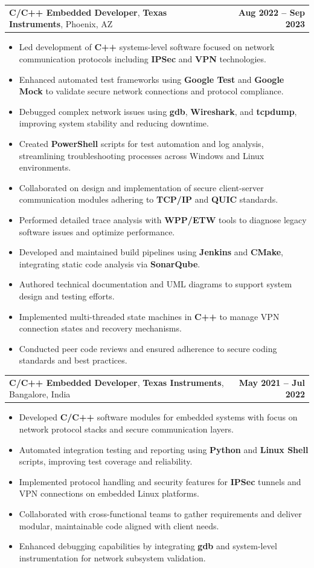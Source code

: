 \documentclass[letterpaper,11pt]{article}
\makeatletter
\newcommand{\resumeItem}[1]{
  \item\footnotesize{
    {#1 \vspace{-2pt}}
  }
}
\newcommand{\resumeSubheading}[4]{
  \vspace{-2pt}\item
    \begin{tabular*}{1.0\textwidth}[t]{l@{\extracolsep{\fill}}r}
      \textbf{\fontsize{10pt}{14pt}\selectfont #3}, \textbf{\fontsize{10pt}{14pt}\selectfont #1}, \fontsize{10pt}{14pt}\selectfont #4 & \textbf{\fontsize{10pt}{14pt}\selectfont #2} \\
    \end{tabular*}\vspace{-7pt}
}
\newcommand{\resumeItemListStart}{\begin{itemize}[leftmargin=*]}
\newcommand{\resumeItemListEnd}{\end{itemize}\vspace{-5pt}}
\makeatother
\begin{document}
    \resumeSubheading
        {Texas Instruments}{Aug 2022 -- Sep 2023}
        {C/C++ Embedded Developer}{Phoenix, AZ}
      \resumeItemListStart
        \resumeItem{Led development of \textbf{C++} systems-level software focused on network communication protocols including \textbf{IPSec} and \textbf{VPN} technologies.}
        \resumeItem{Enhanced automated test frameworks using \textbf{Google Test} and \textbf{Google Mock} to validate secure network connections and protocol compliance.}
        \resumeItem{Debugged complex network issues using \textbf{gdb}, \textbf{Wireshark}, and \textbf{tcpdump}, improving system stability and reducing downtime.}
        \resumeItem{Created \textbf{PowerShell} scripts for test automation and log analysis, streamlining troubleshooting processes across Windows and Linux environments.}
        \resumeItem{Collaborated on design and implementation of secure client-server communication modules adhering to \textbf{TCP/IP} and \textbf{QUIC} standards.}
        \resumeItem{Performed detailed trace analysis with \textbf{WPP/ETW} tools to diagnose legacy software issues and optimize performance.}
        \resumeItem{Developed and maintained build pipelines using \textbf{Jenkins} and \textbf{CMake}, integrating static code analysis via \textbf{SonarQube}.}
        \resumeItem{Authored technical documentation and UML diagrams to support system design and testing efforts.}
        \resumeItem{Implemented multi-threaded state machines in \textbf{C++} to manage VPN connection states and recovery mechanisms.}
        \resumeItem{Conducted peer code reviews and ensured adherence to secure coding standards and best practices.}
      \resumeItemListEnd

    \resumeSubheading
        {Texas Instruments}{May 2021 -- Jul 2022}
        {C/C++ Embedded Developer}{Bangalore, India}
      \resumeItemListStart
        \resumeItem{Developed \textbf{C/C++} software modules for embedded systems with focus on network protocol stacks and secure communication layers.}
        \resumeItem{Automated integration testing and reporting using \textbf{Python} and \textbf{Linux Shell} scripts, improving test coverage and reliability.}
        \resumeItem{Implemented protocol handling and security features for \textbf{IPSec} tunnels and VPN connections on embedded Linux platforms.}
        \resumeItem{Collaborated with cross-functional teams to gather requirements and deliver modular, maintainable code aligned with client needs.}
        \resumeItem{Enhanced debugging capabilities by integrating \textbf{gdb} and system-level instrumentation for network subsystem validation.}
      \resumeItemListEnd
\end{document}
